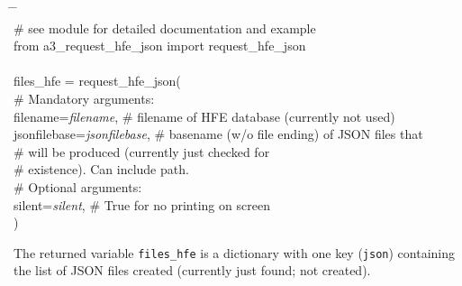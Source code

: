 \documentclass[10pt,a4paper,titlepage,parskip]{scrartcl}
\newenvironment{ttfont}{\fontfamily{\ttdefault}\selectfont}{\par}
\newcommand{\GRAU}[1]{\textcolor{ufzgray2}{#1}}
\begin{document}
\begin{framed}
	\vspace*{-1.2cm}
	\begin{ttfont}
		\begin{tabbing}
			\hspace{1.0cm} \= \hspace{5.2cm} \= \kill \\[4pt]
			\GRAU{\# see module for detailed documentation and example}\\
			from a3\_request\_hfe\_json import request\_hfe\_json\\
			\\
			files\_hfe = request\_hfe\_json( \\
			\> \GRAU{\# Mandatory arguments:}\\
			\> filename=\textit{filename}, \> \GRAU{\# filename of HFE database (currently not used)}\\
			\> jsonfilebase=\textit{jsonfilebase}, \> \GRAU{\# basename (w/o file ending) of JSON files that }\\
			\> \> \GRAU{\# will be produced (currently just checked for }\\
			\> \> \GRAU{\# existence). Can include path.}\\
			\> \GRAU{\# Optional arguments:}\\
			\> silent=\textit{silent}, \> \GRAU{\# True for no printing on screen}\\
			) \> 
		\end{tabbing}
	\end{ttfont}
	\vspace*{-0.3cm}
\end{framed}
\vspace*{-0.3cm}
The returned variable \texttt{files\_hfe} is a dictionary with one key (\texttt{json}) containing the list of JSON files created (currently just found; not created).
\clearpage
\end{document}
